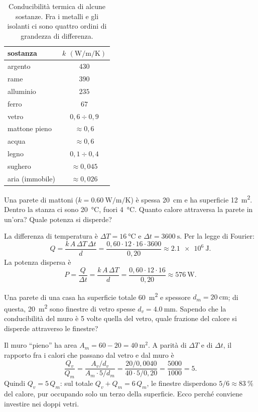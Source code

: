 \begin{table}[!htbp]
    \centering
    \begin{tabular}{lc}
        \toprule
        sostanza & $k$ $(\si{\watt\per\metre\per\kelvin})$ \\
        \midrule
        argento & $430$ \\
        rame & $390$ \\
        alluminio & $235$ \\
        ferro & $67$ \\
        vetro & $0{,}6 \div 0{,}9$ \\
        mattone pieno & $\approx 0{,}6$ \\
        acqua & $\approx 0{,}6$ \\
        legno & $0{,}1 \div 0{,}4$ \\
        sughero & $\approx 0{,}045$ \\
        aria (immobile) & $\approx 0{,}026$ \\
        \bottomrule
    \end{tabular}
    \caption{Conducibilità termica di alcune sostanze. Fra i metalli e gli isolanti ci sono quattro ordini di grandezza di differenza.}
    \label{tab:conducibilita}
\end{table}

\begin{testexample}
Una parete di mattoni ($k = \SI{0,60}{\watt\per\metre\per\kelvin}$) è spessa \SI{20}{\centi\metre} e ha superficie \SI{12}{\metre\squared}. Dentro la stanza ci sono \SI{20}{\celsius}, fuori \SI{4}{\celsius}. Quanto calore attraversa la parete in un'ora? Quale potenza si disperde?

La differenza di temperatura è $\Delta T = \SI{16}{\celsius}$ e $\Delta t = \SI{3600}{\second}$. Per la legge di Fourier:
\[ Q = \frac{k\,A\,\Delta T\,\Delta t}{d} = \frac{0{,}60 \cdot 12 \cdot 16 \cdot 3600}{0{,}20} \approx \SI{2,1e6}{\joule}. \]
La potenza dispersa è
\[ P = \frac{Q}{\Delta t} = \frac{k\,A\,\Delta T}{d} = \frac{0{,}60 \cdot 12 \cdot 16}{0{,}20} \approx \SI{576}{\watt}. \]
\end{testexample}

\begin{testexample}
Una parete di una casa ha superficie totale \SI{60}{\metre\squared} e spessore $d_m = \SI{20}{\centi\metre}$; di questa, \SI{20}{\metre\squared} sono finestre di vetro spesse $d_v = \SI{4,0}{\milli\metre}$. Sapendo che la conducibilità del muro è \num{5} volte quella del vetro, quale frazione del calore si disperde attraverso le finestre?

Il muro ``pieno'' ha area $A_m = 60 - 20 = \SI{40}{\metre\squared}$. A parità di $\Delta T$ e di $\Delta t$, il rapporto fra i calori che passano dal vetro e dal muro è
\[ \frac{Q_v}{Q_m} = \frac{A_v / d_v}{A_m \cdot 5 / d_m} = \frac{20 / 0{,}0040}{40 \cdot 5 / 0{,}20} = \frac{5000}{1000} = 5. \]
Quindi $Q_v = 5\,Q_m$: sul totale $Q_v + Q_m = 6\,Q_m$, le finestre disperdono $5/6 \approx \SI{83}{\percent}$ del calore, pur occupando solo un terzo della superficie. Ecco perché conviene investire nei doppi vetri.
\end{testexample}

